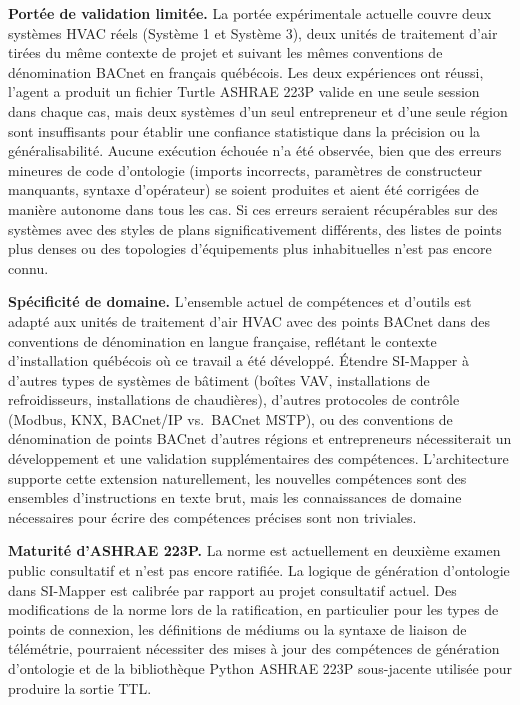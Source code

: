\textbf{Portée de validation limitée.}
La portée expérimentale actuelle couvre deux systèmes HVAC réels (Système 1 et Système 3), deux unités
de traitement d'air tirées du même contexte de projet et suivant les mêmes conventions de dénomination
BACnet en français québécois.
Les deux expériences ont réussi, l'agent a produit un fichier Turtle ASHRAE 223P valide en une seule
session dans chaque cas, mais deux systèmes d'un seul entrepreneur et d'une seule région sont insuffisants
pour établir une confiance statistique dans la précision ou la généralisabilité.
Aucune exécution échouée n'a été observée, bien que des erreurs mineures de code d'ontologie (imports
incorrects, paramètres de constructeur manquants, syntaxe d'opérateur) se soient produites et aient été
corrigées de manière autonome dans tous les cas.
Si ces erreurs seraient récupérables sur des systèmes avec des styles de plans significativement
différents, des listes de points plus denses ou des topologies d'équipements plus inhabituelles n'est
pas encore connu.

\textbf{Spécificité de domaine.}
L'ensemble actuel de compétences et d'outils est adapté aux unités de traitement d'air HVAC avec des
points BACnet dans des conventions de dénomination en langue française, reflétant le contexte
d'installation québécois où ce travail a été développé.
Étendre SI-Mapper à d'autres types de systèmes de bâtiment (boîtes VAV, installations de refroidisseurs,
installations de chaudières), d'autres protocoles de contrôle (Modbus, KNX, BACnet/IP vs.\ BACnet MSTP),
ou des conventions de dénomination de points BACnet d'autres régions et entrepreneurs nécessiterait un
développement et une validation supplémentaires des compétences.
L'architecture supporte cette extension naturellement, les nouvelles compétences sont des ensembles
d'instructions en texte brut, mais les connaissances de domaine nécessaires pour écrire des compétences
précises sont non triviales.

\textbf{Maturité d'ASHRAE 223P.}
La norme est actuellement en deuxième examen public consultatif et n'est pas encore ratifiée.
La logique de génération d'ontologie dans SI-Mapper est calibrée par rapport au projet consultatif actuel.
Des modifications de la norme lors de la ratification, en particulier pour les types de points de
connexion, les définitions de médiums ou la syntaxe de liaison de télémétrie, pourraient nécessiter des
mises à jour des compétences de génération d'ontologie et de la bibliothèque Python ASHRAE 223P sous-jacente
utilisée pour produire la sortie TTL.

